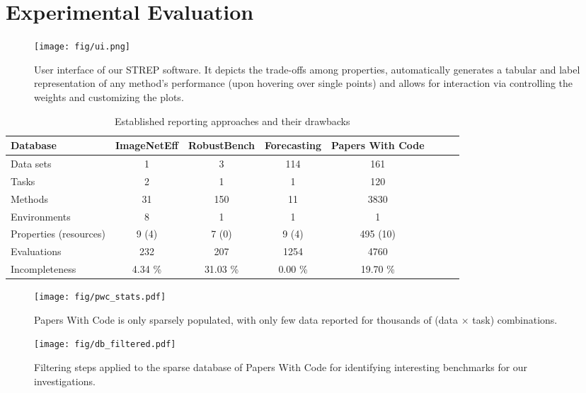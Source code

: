 \documentclass[sn-mathphys,Numbered]{sn-jnl}%
\theoremstyle{thmstylethree}%
\begin{document}
\section{Experimental Evaluation}
\label{sec:experiments}

\begin{figure}
    \centering
    \texttt{[image: fig/ui.png]}
    \caption{User interface of our STREP software. It depicts the trade-offs among properties, automatically generates a tabular and label representation of any method's performance (upon hovering over single points) and allows for interaction via controlling the weights and customizing the plots.}
    \label{fig:ui}
\end{figure}

\setlength{\tabcolsep}{3pt}
\begin{table}
    \caption{Established reporting approaches and their drawbacks}
    \label{tab:databases}
    \centering
    \begin{tabular}{lccccccc}
        \toprule 
        Database & ImageNetEff & RobustBench & Forecasting & Papers With Code \\
        \midrule
        Data sets & 1 & 3 & 114 & 161 \\
        Tasks & 2 & 1 & 1 & 120 \\
        Methods & 31 & 150 & 11 & 3830 \\
        Environments & 8 & 1 & 1 & 1 \\
        Properties (resources) & 9 (4) & 7 (0) & 9 (4) & 495 (10) \\
        Evaluations & 232 & 207 & 1254 & 4760 \\
        Incompleteness &  4.34 \% & 31.03 \% &  0.00 \% & 19.70 \% \\
        \bottomrule
    \end{tabular}
\end{table}

\begin{figure}
    \centering
    \begin{minipage}[t]{.48\textwidth}
        \texttt{[image: fig/pwc\_stats.pdf]}
        \caption{Papers With Code is only sparsely populated, with only few data reported for thousands of (data $\times$ task) combinations.}
        \label{fig:pwc_stats}
    \end{minipage}
    \hfill
    \begin{minipage}[t]{.48\textwidth}
        \texttt{[image: fig/db\_filtered.pdf]}
        \caption{Filtering steps applied to the sparse database of Papers With Code for identifying interesting benchmarks for our investigations.}
        \label{fig:db_filtered}
    \end{minipage}
\end{figure}
\end{document}

